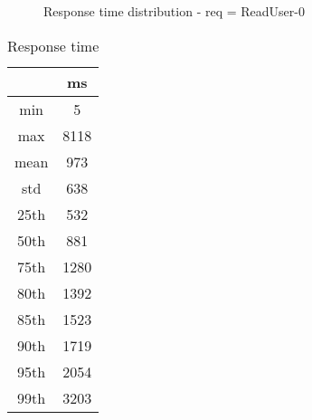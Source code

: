 \begin{minipage}{0.75\linewidth}
\begin{figure}[h]
\begin{adjustbox}{max width=1.0\linewidth, keepaspectratio}
  \end{adjustbox}
  \caption{Response time distribution - req = ReadUser-0}
\end{figure}
\end{minipage}\hfill\begin{minipage}{0.18\linewidth}
\begin{table}[h]
\begin{tabular}{|cc|}
\hline
\textbf{} & \textbf{ms}\\ \hline
 \Xhline{0.005\arrayrulewidth}
min & 5\\
 \Xhline{0.005\arrayrulewidth}
max & 8118\\
 \Xhline{0.005\arrayrulewidth}
mean & 973\\
 \Xhline{0.005\arrayrulewidth}
std & 638\\
\hline
\hline
 \Xhline{0.005\arrayrulewidth}
25th & 532\\
 \Xhline{0.005\arrayrulewidth}
50th & 881\\
 \Xhline{0.005\arrayrulewidth}
75th & 1280\\
 \Xhline{0.005\arrayrulewidth}
80th & 1392\\
 \Xhline{0.005\arrayrulewidth}
85th & 1523\\
 \Xhline{0.005\arrayrulewidth}
90th & 1719\\
 \Xhline{0.005\arrayrulewidth}
95th & 2054\\
 \Xhline{0.005\arrayrulewidth}
99th & 3203\\
\hline
\end{tabular}
\caption{Response time}
\end{table}
\end{minipage}\hfill